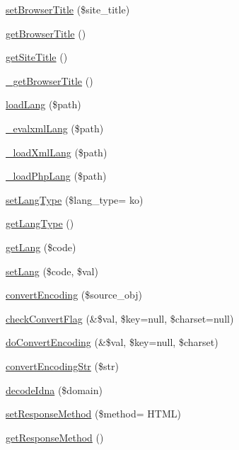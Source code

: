 \begin{DoxyCompactItemize}
\hyperlink{classContext_aab07bc95a7a855c4d9608b4ed615807f}{set\+Browser\+Title} (\$site\+\_\+title)
\item 
\hyperlink{classContext_a19f432349a41af2ed36b2cd5e6ba96a5}{get\+Browser\+Title} ()
\item 
\hyperlink{classContext_a0ee79330d3ee12c811cd784e24a7b017}{get\+Site\+Title} ()
\item 
\hyperlink{classContext_ab8f518a596abcbbd70b20dd46442ae0a}{\+\_\+get\+Browser\+Title} ()
\item 
\hyperlink{classContext_a7b22a741ff804e5cdaafd952273bd70c}{load\+Lang} (\$path)
\item 
\hyperlink{classContext_a45bd19b6edf9e66582842a3f6e50fa4b}{\+\_\+evalxml\+Lang} (\$path)
\item 
\hyperlink{classContext_af3ba6aaa8fa5f6c758b7716ec7135ab3}{\+\_\+load\+Xml\+Lang} (\$path)
\item 
\hyperlink{classContext_a3ad6fc7782e7234fe77357da28218310}{\+\_\+load\+Php\+Lang} (\$path)
\item 
\hyperlink{classContext_ad70a3a0db09c75a9eb20e8f5f1df305f}{set\+Lang\+Type} (\$lang\+\_\+type= \textquotesingle{}ko\textquotesingle{})
\item 
\hyperlink{classContext_ae75d6f4064d09e48d0d76614b6997e29}{get\+Lang\+Type} ()
\item 
\hyperlink{classContext_a9af9269b04542f7462d27a63226e0ff3}{get\+Lang} (\$code)
\item 
\hyperlink{classContext_a3615e0bc64da445f6165e97785c7d94c}{set\+Lang} (\$code, \$val)
\item 
\hyperlink{classContext_a9ef4f41a9ae7108ea7560162399c77a8}{convert\+Encoding} (\$source\+\_\+obj)
\item 
\hyperlink{classContext_ac2bf2f97195aae6b2cd6ba559bbcb18f}{check\+Convert\+Flag} (\&\$val, \$key=null, \$charset=null)
\item 
\hyperlink{classContext_ade825b985221f5bef69919e30e9ed248}{do\+Convert\+Encoding} (\&\$val, \$key=null, \$charset)
\item 
\hyperlink{classContext_a0464dcbadfd67f62265fac90546d3bf8}{convert\+Encoding\+Str} (\$str)
\item 
\hyperlink{classContext_a122117b49e4926d40dc6fc76297792bc}{decode\+Idna} (\$domain)
\item 
\hyperlink{classContext_afc58a19e296dfc70a95648f35bb0f3a9}{set\+Response\+Method} (\$method= \textquotesingle{}H\+T\+M\+L\textquotesingle{})
\item 
\hyperlink{classContext_a1d02a15209360034cd719d8b08cb5061}{get\+Response\+Method} ()

\end{DoxyCompactItemize}
